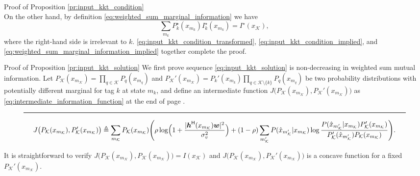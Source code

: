 \documentclass[journal]{IEEEtran}
\begin{document}
\begin{appendix}
\begin{subsection}{Proof of Proposition \ref{pr:input_kkt_condition}}
\begin{equation}
			\label{eq:input_kkt_condition_implied}
		\end{equation}
		On the other hand, by definition \eqref{eq:weighted_sum_marginal_information} we have
		\begin{equation}
			\sum_{m_k} P_k^\star(x_{m_k}) I_k^\star(x_{m_k}) = I^\star(x_{\mathcal{K}}),
			\label{eq:weighted_sum_marginal_information_implied}
		\end{equation}
		where the right-hand side is irrelevant to $k$.
		\eqref{eq:input_kkt_condition_transformed}, \eqref{eq:input_kkt_condition_implied}, and \eqref{eq:weighted_sum_marginal_information_implied} together complete the proof.
		\label{ap:input_kkt_condition}
	\end{subsection}

	\begin{subsection}{Proof of Proposition \ref{pr:input_kkt_solution}}
		We first prove sequence \eqref{eq:input_kkt_solution} is non-decreasing in weighted sum mutual information.
		Let $P_{\mathcal{K}}(x_{m_{\mathcal{K}}}) = \prod_{q \in \mathcal{K}} P_q(x_{m_q})$ and $P_{\mathcal{K}}'(x_{m_{\mathcal{K}}}) = P_k'(x_{m_k}) \prod_{q \in \mathcal{K} \setminus \{k\}} P_q(x_{m_q})$ be two probability distributions with potentially different marginal for tag $k$ at state $m_k$, and define an intermediate function $J \bigl( P_{\mathcal{K}}(x_{m_{\mathcal{K}}}),P_{\mathcal{K}}'(x_{m_{\mathcal{K}}}) \bigr)$ as \eqref{eq:intermediate_information_function} at the end of page \pageref{eq:intermediate_information_function}.
		\begin{figure*}[!b]
			\hrule
			\begin{equation}
				J \bigl( P_{\mathcal{K}}(x_{m_{\mathcal{K}}}),P_{\mathcal{K}}'(x_{m_{\mathcal{K}}}) \bigr) \triangleq \sum_{m_{\mathcal{K}}} P_{\mathcal{K}}(x_{m_{\mathcal{K}}})
				\Biggl( \rho \log \Bigl(1 + \frac{\lvert \boldsymbol{h}^\mathsf{H}(x_{m_{\mathcal{K}}}) \boldsymbol{w} \rvert^2}{\sigma_v^2}\Bigr) + (1 - \rho) \sum_{m_{\mathcal{K}}'} P(\hat{x}_{m_{\mathcal{K}}'}|x_{m_{\mathcal{K}}}) \log \frac{P(\hat{x}_{m_{\mathcal{K}}'}|x_{m_{\mathcal{K}}}) P_{\mathcal{K}}'(x_{m_{\mathcal{K}}})}{P_{\mathcal{K}}'(\hat{x}_{m_{\mathcal{K}}'}) P_{\mathcal{K}}(x_{m_{\mathcal{K}}})} \Biggr).
				\label{eq:intermediate_information_function}
			\end{equation}
		\end{figure*}
		It is straightforward to verify $J \bigl( P_{\mathcal{K}}(x_{m_{\mathcal{K}}}),P_{\mathcal{K}}(x_{m_{\mathcal{K}}}) \bigr) = I(x_{\mathcal{K}})$ and $J \bigl( P_{\mathcal{K}}(x_{m_{\mathcal{K}}}),P_{\mathcal{K}}'(x_{m_{\mathcal{K}}}) \bigr)$ is a concave function for a fixed $P_{\mathcal{K}}'(x_{m_{\mathcal{K}}})$.

\end{subsection}
\end{appendix}
\end{document}
